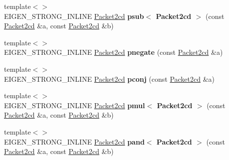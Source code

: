 \begin{DoxyCompactItemize}
\item 
\mbox{\label{namespace_eigen_1_1internal_a796eece972211838da064178248d1d81}} 
{\footnotesize template$<$$>$ }\\E\+I\+G\+E\+N\+\_\+\+S\+T\+R\+O\+N\+G\+\_\+\+I\+N\+L\+I\+NE \hyperlink{struct_eigen_1_1internal_1_1_packet2cd}{Packet2cd} {\bfseries psub$<$ Packet2cd $>$} (const \hyperlink{struct_eigen_1_1internal_1_1_packet2cd}{Packet2cd} \&a, const \hyperlink{struct_eigen_1_1internal_1_1_packet2cd}{Packet2cd} \&b)
\item 
\mbox{\label{namespace_eigen_1_1internal_a0e342efdf30e450a66070cde342ea6f5}} 
{\footnotesize template$<$$>$ }\\E\+I\+G\+E\+N\+\_\+\+S\+T\+R\+O\+N\+G\+\_\+\+I\+N\+L\+I\+NE \hyperlink{struct_eigen_1_1internal_1_1_packet2cd}{Packet2cd} {\bfseries pnegate} (const \hyperlink{struct_eigen_1_1internal_1_1_packet2cd}{Packet2cd} \&a)
\item 
\mbox{\label{namespace_eigen_1_1internal_ae0f694c1c6d63b471f39d195854b38b6}} 
{\footnotesize template$<$$>$ }\\E\+I\+G\+E\+N\+\_\+\+S\+T\+R\+O\+N\+G\+\_\+\+I\+N\+L\+I\+NE \hyperlink{struct_eigen_1_1internal_1_1_packet2cd}{Packet2cd} {\bfseries pconj} (const \hyperlink{struct_eigen_1_1internal_1_1_packet2cd}{Packet2cd} \&a)
\item 
\mbox{\label{namespace_eigen_1_1internal_acba737094bb4027ac5dcc254b97ce74d}} 
{\footnotesize template$<$$>$ }\\E\+I\+G\+E\+N\+\_\+\+S\+T\+R\+O\+N\+G\+\_\+\+I\+N\+L\+I\+NE \hyperlink{struct_eigen_1_1internal_1_1_packet2cd}{Packet2cd} {\bfseries pmul$<$ Packet2cd $>$} (const \hyperlink{struct_eigen_1_1internal_1_1_packet2cd}{Packet2cd} \&a, const \hyperlink{struct_eigen_1_1internal_1_1_packet2cd}{Packet2cd} \&b)
\item 
\mbox{\label{namespace_eigen_1_1internal_a430daf5d4c58ae8df102eda3debe29ae}} 
{\footnotesize template$<$$>$ }\\E\+I\+G\+E\+N\+\_\+\+S\+T\+R\+O\+N\+G\+\_\+\+I\+N\+L\+I\+NE \hyperlink{struct_eigen_1_1internal_1_1_packet2cd}{Packet2cd} {\bfseries pand$<$ Packet2cd $>$} (const \hyperlink{struct_eigen_1_1internal_1_1_packet2cd}{Packet2cd} \&a, const \hyperlink{struct_eigen_1_1internal_1_1_packet2cd}{Packet2cd} \&b)

\end{DoxyCompactItemize}
